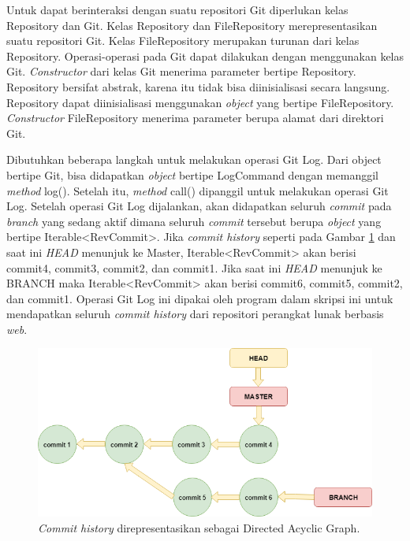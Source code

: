Untuk dapat berinteraksi dengan suatu repositori Git diperlukan kelas Repository dan Git. Kelas Repository dan FileRepository merepresentasikan suatu repositori Git. Kelas FileRepository merupakan turunan dari kelas Repository. Operasi-operasi pada Git dapat dilakukan dengan menggunakan kelas Git. \textit{Constructor} dari kelas Git menerima parameter bertipe Repository. Repository bersifat abstrak, karena itu tidak bisa diinisialisasi secara langsung. Repository dapat diinisialisasi menggunakan \textit{object} yang bertipe FileRepository. \textit{Constructor} FileRepository menerima parameter berupa alamat dari direktori Git. 

Dibutuhkan beberapa langkah untuk melakukan operasi Git Log. Dari object bertipe Git, bisa didapatkan \textit{object} bertipe LogCommand dengan memanggil \textit{method} log(). Setelah itu, \textit{method} call() dipanggil untuk melakukan operasi Git Log. Setelah operasi Git Log dijalankan, akan didapatkan seluruh \textit{commit} pada \textit{branch} yang sedang aktif dimana seluruh \textit{commit} tersebut berupa \textit{object} yang bertipe Iterable<RevCommit>. Jika \textit{commit history} seperti pada Gambar \ref{fig:DAG} dan saat ini \textit{HEAD} menunjuk ke Master, Iterable<RevCommit> akan berisi commit4, commit3, commit2, dan commit1. Jika saat ini \textit{HEAD} menunjuk ke BRANCH maka Iterable<RevCommit> akan berisi commit6, commit5, commit2, dan commit1. Operasi Git Log ini dipakai oleh program dalam skripsi ini untuk mendapatkan seluruh \textit{commit history} dari repositori perangkat lunak berbasis \textit{web}.

\begin{figure}[H]
	\centering
		\includegraphics[scale=0.6]{Gambar/DAG.png}
	\caption{\textit{Commit history} direpresentasikan sebagai Directed Acyclic Graph.}
	\label{fig:DAG}
\end{figure}

